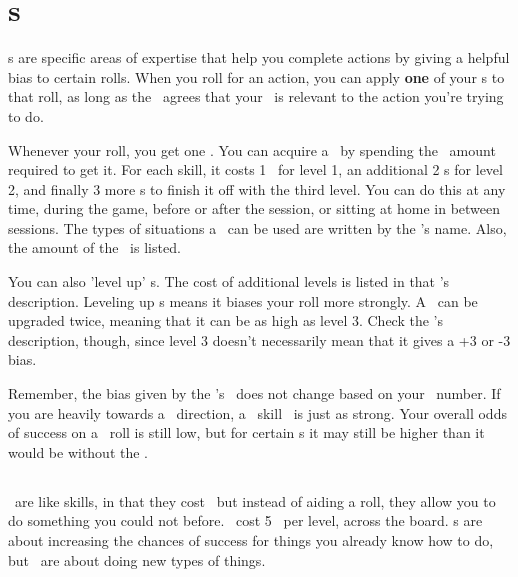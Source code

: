 
\section{\skillC s}

\par
\skillC s are specific areas of expertise that help you complete actions by giving a helpful bias to certain rolls. When you roll for an action, you can apply \textbf{one} of your \skill s to that roll, as long as the \gm\, agrees that your \skill\, is relevant to the action you're trying to do.

\par
Whenever your roll, you get one \xp . You can acquire a \skill\, by spending the \xp\, amount required to get it. For each skill, it costs 1 \xp\, for level 1, an additional 2 \xp s for level 2, and finally 3 more \xp s to finish it off with the third level. You can do this at any time, during the game, before or after the session, or sitting at home in between sessions. The types of situations a \skill\, can be used are written by the \skill 's name. Also, the amount of the \modifier\, is listed.

\par
You can also 'level up' \skill s. The cost of additional levels is listed in that \skill 's description. Leveling up \skill s means it biases your roll more strongly. A \skill\, can be upgraded twice, meaning that it can be as high as level 3. Check the \skill 's description, though, since level 3 doesn't necessarily mean that it gives a +3 or -3 bias.

\par
Remember, the bias given by the \skill 's \modifier\, does not change based on your \both\, number. If you are heavily towards a \feelings\, direction, a \lasers\, skill \modifier\, is just as strong. Your overall odds of success on a \lasers\, roll is still low, but for certain \skill s it may still be higher than it would be without the \skill .

\subsection{\abilityPC}
\abilityPC\, are like skills, in that they cost \xp\, but instead of aiding a roll, they allow you to do something you could not before. \abilityPC\, cost 5 \xp\, per level, across the board. \skillC s are about increasing the chances of success for things you already know how to do, but \abilityP\, are about doing new types of things.